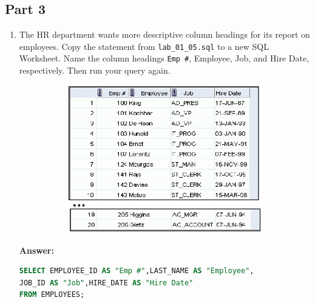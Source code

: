 \documentclass[a4paper,12pt]{article}
\begin{document}
\subsection*{Part 3}
\begin{enumerate}[start=8]
    \item The HR department wants more descriptive column headings for its report on employees. Copy
    the statement from \texttt{lab\_01\_05.sql} to a new SQL Worksheet. Name the column headings
    \texttt{Emp \#}, Employee, Job, and Hire Date, respectively. Then run your query again.
    \begin{figure}[h]
        \centering
        \begin{subfigure}[b]{0.5\linewidth}
            \centering
            \includegraphics[width=\linewidth]{graphics/8.png}
        \end{subfigure}
    \end{figure}

    \textbf{Answer: }
    \begin{lstlisting}[language=SQL]
SELECT EMPLOYEE_ID AS "Emp #",LAST_NAME AS "Employee", 
JOB_ID AS "Job",HIRE_DATE AS "Hire Date"
FROM EMPLOYEES;
    \end{lstlisting}
    

\end{enumerate}
\end{document}
